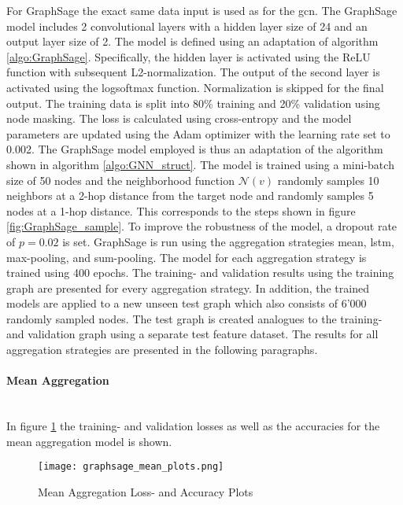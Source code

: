   For GraphSage the exact same data input is used as for the \acs{gcn}. The 
  GraphSage model includes 2 convolutional layers with a hidden layer size of
  24 and an output layer size of 2. The model is defined using an adaptation of 
  algorithm \ref{algo:GraphSage}. Specifically, the hidden layer is activated 
  using the ReLU function with subsequent L2-normalization. The output of the 
  second layer is activated using the logsoftmax function. Normalization is 
  skipped for the final output. The training data is split into 80\% training 
  and 20\% validation using node masking. The loss is calculated using 
  cross-entropy and the model parameters are updated using the Adam optimizer 
  with the learning rate set to 0.002. The GraphSage model employed is thus an
  adaptation of the algorithm shown in algorithm \ref{algo:GNN_struct}. The 
  model is trained using a mini-batch size of 50 nodes and the neighborhood 
  function $\mathcal{N}(v)$ randomly samples 10 neighbors at a 2-hop distance
  from the target node and randomly samples 5 nodes at a 1-hop distance. This 
  corresponds to the steps shown in figure \ref{fig:GraphSage_sample}. To 
  improve the robustness of the model, a dropout rate of $p = 0.02$ is set. 
  GraphSage is run using the aggregation strategies mean, \acs{lstm},
  max-pooling, and sum-pooling. The model for each aggregation strategy is 
  trained using 400 epochs. The training- and validation results using the 
  training graph are presented for every aggregation strategy. In addition, 
  the trained models are applied to a new unseen test graph which also consists 
  of 6'000 randomly sampled nodes. The test graph is created analogues to the 
  training- and validation graph using a separate test feature dataset. The 
  results for all aggregation strategies are presented in the following 
  paragraphs. 

  \paragraph{Mean Aggregation}  \mbox{}\\ 
  In figure \ref{fig:mean_aggregation} the training- and validation losses as
  well as the accuracies for the mean aggregation model is shown.

  \begin{figure}[h]
		\centering
		\texttt{[image: graphsage\_mean\_plots.png]}
		\caption{Mean Aggregation Loss- and Accuracy Plots}
        \label{fig:mean_aggregation}
  \end{figure}

